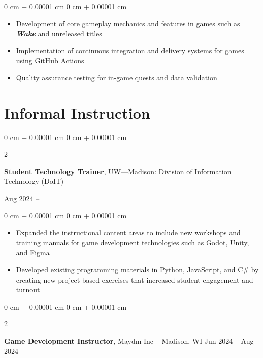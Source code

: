 \documentclass[10pt, letterpaper]{article}
\newenvironment{highlights}{
    \begin{itemize}[
        topsep=0.10 cm,
        parsep=0.10 cm,
        partopsep=0pt,
        itemsep=0pt,
        leftmargin=0 cm + 10pt
    ]
}{
    \end{itemize}
} %
\newenvironment{onecolentry}{
    \begin{adjustwidth}{
        0 cm + 0.00001 cm
    }{
        0 cm + 0.00001 cm
    }
}{
    \end{adjustwidth}
} %
\newenvironment{twocolentry}[2][]{
    \onecolentry
    \def\secondColumn{#2}
    \setcolumnwidth{\fill, 4.5 cm}
    \begin{paracol}{2}
}{
    \switchcolumn \raggedleft \secondColumn
    \end{paracol}
    \endonecolentry
} %
\begin{document}
        \vspace{0.10 cm}
        \begin{onecolentry}
            \begin{highlights}
                \item Development of core gameplay mechanics and features in games such as \textbf{\textit{Wake}} and unreleased titles
                \item Implementation of continuous integration and delivery systems for games using GitHub Actions 
                \item Quality assurance testing for in-game quests and data validation 
            \end{highlights}
        \end{onecolentry}

        \vspace{0.2 cm}
    
    \section{Informal Instruction}
        \begin{twocolentry}{
            Aug 2024 – 
        }
            \textbf{Student Technology Trainer}, UW—Madison: Division of Information Technology (DoIT)
            \end{twocolentry}

        \vspace{0.10 cm}
        \begin{onecolentry}
            \begin{highlights}
                \item Expanded the instructional content areas to include new workshops and training manuals for game development technologies such as Godot, Unity, and Figma
                \item Developed existing programming materials in Python, JavaScript, and C\# by creating new project-based exercises that increased student engagement and turnout
            \end{highlights}
        \end{onecolentry}

        \vspace{0.2 cm}
        
        \begin{twocolentry}{
            Jun 2024 – Aug 2024
        }
            \textbf{Game Development Instructor}, Maydm Inc -- Madison, WI\end{twocolentry}
\end{document}
